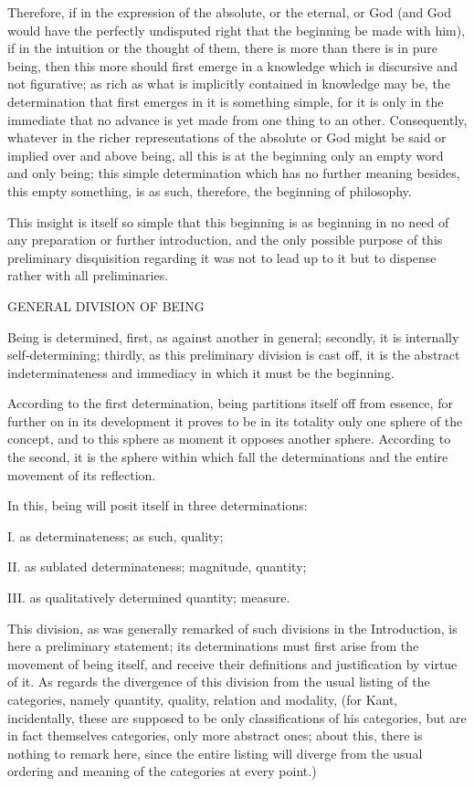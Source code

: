 Therefore, if in the expression of the absolute,
or the eternal, or God
(and God would have the perfectly undisputed right
that the beginning be made with him),
if in the intuition or the thought of them,
there is more than there is in pure being,
then this more should first emerge in a knowledge
which is discursive and not figurative;
as rich as what is implicitly contained in knowledge may be,
the determination that first emerges in it is something simple,
for it is only in the immediate that no advance is
yet made from one thing to an other.
Consequently, whatever in the richer representations
of the absolute or God might be said or implied over and above being,
all this is at the beginning only an empty word and only being;
this simple determination which has no further meaning
besides, this empty something, is as such, therefore,
the beginning of philosophy.

This insight is itself so simple that this beginning is
as beginning in no need of any preparation or further introduction,
and the only possible purpose of this preliminary disquisition regarding it
was not to lead up to it but to dispense rather with all preliminaries.

GENERAL DIVISION OF BEING

Being is determined, first, as against another in general;
secondly, it is internally self-determining;
thirdly, as this preliminary division is cast off,
it is the abstract indeterminateness and immediacy
in which it must be the beginning.

According to the first determination,
being partitions itself off from essence,
for further on in its development it proves to be
in its totality only one sphere of the concept,
and to this sphere as moment it opposes another sphere.
According to the second, it is the sphere
within which fall the determinations
and the entire movement of its reflection.

In this, being will posit itself in three determinations:

I. as determinateness; as such, quality;

II. as sublated determinateness; magnitude, quantity;

III. as qualitatively determined quantity; measure.

This division, as was generally remarked of
such divisions in the Introduction,
is here a preliminary statement;
its determinations must first arise
from the movement of being itself,
and receive their definitions and justification by virtue of it.
As regards the divergence of this division from
the usual listing of the categories,
namely quantity, quality, relation and modality,
(for Kant, incidentally, these are supposed to be
only classifications of his categories,
but are in fact themselves categories,
only more abstract ones;
about this, there is nothing to remark here,
since the entire listing will diverge from
the usual ordering and meaning of
the categories at every point.)

